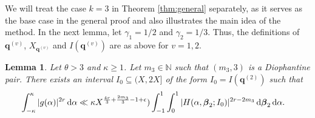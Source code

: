 \documentclass[11pt,reqno]{amsart}
\newtheorem{lemma}{Lemma}[section]
\numberwithin{equation}{section}
\renewcommand{\d}{\,{\rm d}}
\begin{document}
We will treat the case $k = 3$ in Theorem \ref{thm:general} separately, as it serves as the base case in the general proof and also illustrates the main idea of the method. 
In the next lemma, let $\gamma_1 = 1/2$ and $\gamma_2 = 1/3$. Thus, the definitions of $\mathbf{q}^{(v)}$, $X_{\mathbf{q}^{(v)}}$ and $I(\mathbf{q}^{(v)})$ are as above for $v = 1, 2$. 

\begin{lemma} \label{lem:meancase2}
Let $\theta> 3$ and $\kappa \geq 1$. Let $m_3 \in \mathbb{N}$ such that $(m_3,3)$ is a Diophantine pair. There exists an interval $I_0 \subseteq (X,2X]$ of the form $I_0 = I(\mathbf{q}^{(2)}) $ such that 
\begin{align*} \int_{-\kappa}^{\kappa} |g(\alpha)|^{2r} \d\alpha 
& \ll \kappa X^{\frac{4r}{3}+\frac{2m_3}{3}-1+\epsilon})\int_{-1}^{1} \int_0^1 |H(\alpha,\boldsymbol{\beta}_2;I_0)|^{2r-2m_3} \d \boldsymbol{\beta}_2 \d \alpha.  
\end{align*}
\end{lemma} 
\end{document}
